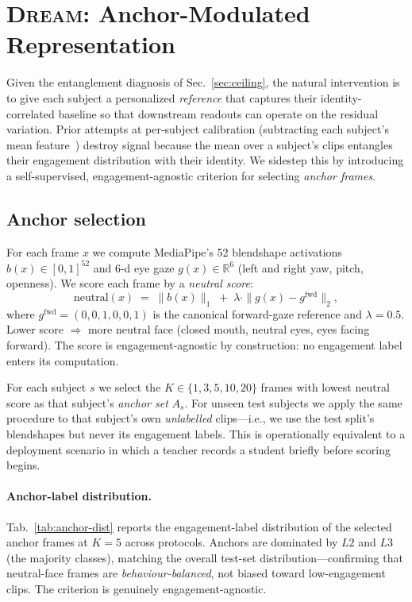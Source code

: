 \section{\textsc{Dream}: Anchor-Modulated Representation}
\label{sec:dream}

Given the entanglement diagnosis of Sec.~\ref{sec:ceiling}, the
natural intervention is to give each subject a personalized
\emph{reference} that captures their identity-correlated baseline so
that downstream readouts can operate on the residual variation. Prior
attempts at per-subject calibration (subtracting each subject's mean
feature~\cite{tian2024tfic}) destroy signal because the mean over a
subject's clips entangles their engagement distribution with their
identity. We sidestep this by introducing a self-supervised,
engagement-agnostic criterion for selecting \emph{anchor frames}.

\subsection{Anchor selection}
\label{sec:anchor-select}

For each frame $x$ we compute MediaPipe's 52 blendshape activations
$b(x) \in [0,1]^{52}$ and 6-d eye gaze $g(x) \in \mathbb{R}^6$ (left
and right yaw, pitch, openness). We score each frame by a
\emph{neutral score}:
\begin{equation}
\mathrm{neutral}(x) \;=\; \|b(x)\|_1 \;+\; \lambda \cdot \|g(x) - g^{\mathrm{fwd}}\|_2,
\end{equation}
where $g^{\mathrm{fwd}} = (0,0,1,0,0,1)$ is the canonical
forward-gaze reference and $\lambda = 0.5$. Lower score $\Rightarrow$
more neutral face (closed mouth, neutral eyes, eyes facing forward).
The score is engagement-agnostic by construction: no engagement label
enters its computation.

For each subject $s$ we select the $K \in \{1, 3, 5, 10, 20\}$ frames
with lowest neutral score as that subject's \emph{anchor set} $A_s$.
For unseen test subjects we apply the same procedure to that
subject's own \emph{unlabelled} clips---i.e., we use the test split's
blendshapes but never its engagement labels. This is operationally
equivalent to a deployment scenario in which a teacher records a
student briefly before scoring begins.

\paragraph{Anchor-label distribution.} Tab.~\ref{tab:anchor-dist}
reports the engagement-label distribution of the selected anchor
frames at $K = 5$ across protocols. Anchors are dominated by $L2$
and $L3$ (the majority classes), matching the overall test-set
distribution---confirming that neutral-face frames are
\emph{behaviour-balanced}, not biased toward low-engagement clips.
The criterion is genuinely engagement-agnostic.

